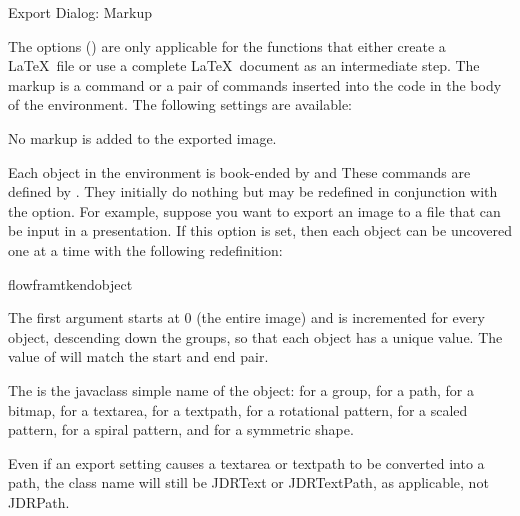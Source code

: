 
 {}
 {Export Dialog: Markup}

The  options
() are only applicable for the
 functions that either create a
\LaTeX\ file or use a complete \LaTeX\ document as an intermediate
step. The markup is a command or a pair of commands inserted into
the code in the body of the  environment.  The
following settings are available:


No markup is added to the exported image.


Each object in the  environment is book-ended by
and
These commands are defined by . They initially
do nothing but may be redefined in conjunction with 
the  option.
For example, suppose you want to export an image to a file that can
be input in a  presentation. If this option is set, then each object can be
uncovered one at a time with the following redefinition:
\begin{codebox}
\gls{flowframtkendobject}
\end{codebox}

The first argument  starts at 0 (the entire image) and is
incremented for every \gls{object}, descending down the
\glspl{group}, so that each \gls{object} has a unique value.
The value of  will match the start and end pair.

The  is the \gls{javaclass} simple name of the \gls{object}:
 for a \gls{group},  for a \gls{path},
 for a \gls{bitmap},
 for a \gls{textarea},
 for a \gls{textpath},
 for a rotational \gls{pattern},
 for a scaled \gls{pattern},
 for a spiral \gls{pattern}, and
 for a symmetric shape.

\begin{information}
Even if an export setting causes a \gls{textarea} or \gls{textpath}
to be converted into a path, the class name will still be
\gls{JDRText} or \gls{JDRTextPath}, as applicable, not
\gls{JDRPath}.
\end{information}

